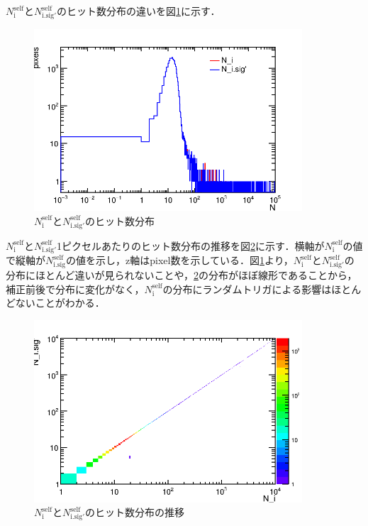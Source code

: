$N_{\mathrm{i}}^{\mathrm{self}}$と$N_{\mathrm{i.sig'}}^{\mathrm{self}}$のヒット数分布の違いを図\ref{fig:selfhitperpix1}に示す．
\begin{figure}[h]
  \centering
  \includegraphics[width=10cm]{./figure/selfhitperpix1.png}
  \caption{$N_{\mathrm{i}}^{\mathrm{self}}$と$N_{\mathrm{i.sig'}}^{\mathrm{self}}$のヒット数分布}
  \label{fig:selfhitperpix1}
\end{figure}

$N_{\mathrm{i}}^{\mathrm{self}}$と$N_{\mathrm{i.sig'}}^{\mathrm{self}}$1ピクセルあたりのヒット数分布の推移を図\ref{fig:selfhitperpix1bfaf}に示す．横軸が$N_{\mathrm{i}}^{\mathrm{self}}$の値で縦軸が$N_{\mathrm{i.sig}}^{\mathrm{self}}$の値を示し，z軸はpixel数を示している．図\ref{fig:selfhitperpix1}より，$N_{\mathrm{i}}^{\mathrm{self}}$と$N_{\mathrm{i.sig'}}^{\mathrm{self}}$の分布にほとんど違いが見られないことや，\ref{fig:selfhitperpix1bfaf}の分布がほぼ線形であることから，補正前後で分布に変化がなく，$N_{\mathrm{i}}^{\mathrm{self}}$の分布にランダムトリガによる影響はほとんどないことがわかる．

\begin{figure}[h]
  \centering
  \includegraphics[width=10cm]{./figure/selfhitperpixbfaf1.png}
  \caption{$N_{\mathrm{i}}^{\mathrm{self}}$と$N_{\mathrm{i.sig'}}^{\mathrm{self}}$のヒット数分布の推移}
  \label{fig:selfhitperpix1bfaf}
\end{figure}

